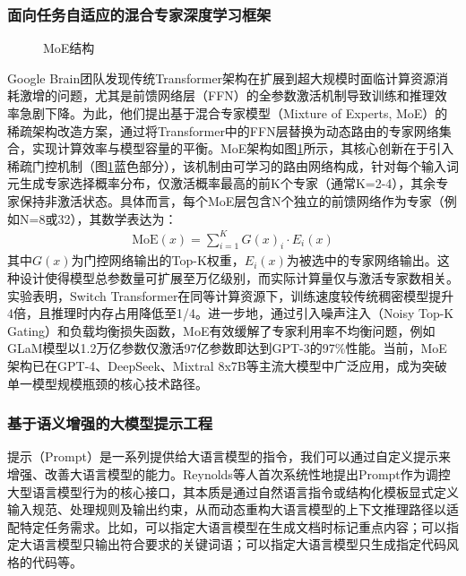 \documentclass[UTF8,a4paper,12pt]{ctexart}
\numberwithin{equation}{section}
\begin{document}
\subsubsection{面向任务自适应的混合专家深度学习框架}
\begin{figure}[H]
	\caption{MoE结构}
	\label{MoE}
\end{figure}
Google Brain团队发现传统Transformer架构在扩展到超大规模时面临计算资源消耗激增的问题，尤其是前馈网络层（FFN）的全参数激活机制导致训练和推理效率急剧下降。为此，他们提出基于混合专家模型（Mixture of Experts, MoE）的稀疏架构改造方案，通过将Transformer中的FFN层替换为动态路由的专家网络集合，实现计算效率与模型容量的平衡。MoE架构如图\ref{MoE}所示，其核心创新在于引入稀疏门控机制（图\ref{MoE}蓝色部分），该机制由可学习的路由网络构成，针对每个输入词元生成专家选择概率分布，仅激活概率最高的前K个专家（通常K=2-4），其余专家保持非激活状态。具体而言，每个MoE层包含N个独立的前馈网络作为专家（例如N=8或32），其数学表达为：
\begin{eqnarray}
	\mathrm{MoE}(x)=\sum_{i=1}^KG(x)_i\cdot E_i(x)
	\label{func_5}
\end{eqnarray}
其中$G(x)$为门控网络输出的Top-K权重，$E_i(x)$为被选中的专家网络输出。这种设计使得模型总参数量可扩展至万亿级别，而实际计算量仅与激活专家数相关。实验表明，Switch Transformer在同等计算资源下，训练速度较传统稠密模型提升4倍，且推理时内存占用降低至1/4。进一步地，通过引入噪声注入（Noisy Top-K Gating）和负载均衡损失函数，MoE有效缓解了专家利用率不均衡问题，例如GLaM模型以1.2万亿参数仅激活97亿参数即达到GPT-3的97\%性能。当前，MoE架构已在GPT-4、DeepSeek、Mixtral 8x7B等主流大模型中广泛应用，成为突破单一模型规模瓶颈的核心技术路径。

\subsubsection{基于语义增强的大模型提示工程}
提示（Prompt）是一系列提供给大语言模型的指令，我们可以通过自定义提示来增强、改善大语言模型的能力。Reynolds等人首次系统性地提出Prompt作为调控大型语言模型行为的核心接口，其本质是通过自然语言指令或结构化模板显式定义输入规范、处理规则及输出约束，从而动态重构大语言模型的上下文推理路径以适配特定任务需求。比如，可以指定大语言模型在生成文档时标记重点内容；可以指定大语言模型只输出符合要求的关键词语；可以指定大语言模型只生成指定代码风格的代码等。\par
\end{document}
